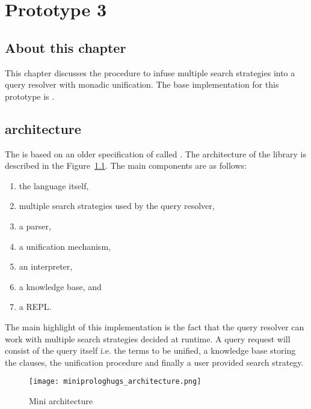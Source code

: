 \documentclass[thesis-solanki.tex]{files}
\begin{document}
\chapter{Prototype 3}{\label{proto3}}


\section{About this chapter}
This chapter discusses the procedure to infuse multiple search strategies into a  query resolver with monadic unification. 
The base implementation for this prototype is  \cite{website:mini-prolog-hugs98}.


\section{ \cite{website:mini-prolog-hugs98} architecture}
The  is based on an older specification of  called . The architecture of
the library is described in the Figure~\ref{fig:miniprlgarchitecture}. The main components are as follows:

\begin{enumerate}
\item the language itself,

\item multiple search strategies used by the query resolver,

\item a parser,

\item a unification mechanism,

\item an interpreter,

\item a knowledge base, and

\item a REPL.  
\end{enumerate}

The main highlight of this implementation is the fact that the query resolver can work with multiple search strategies decided at runtime. A query request 
will consist of the query itself i.e. the terms to be unified, a knowledge base storing the clauses, the unification procedure and finally a user provided 
search strategy. 


\begin{figure}[H]
  \centering
  \texttt{[image: miniprologhugs\_architecture.png]}
  \caption{Mini  architecture}
  \label{fig:miniprlgarchitecture}
\end{figure}
\end{document}
